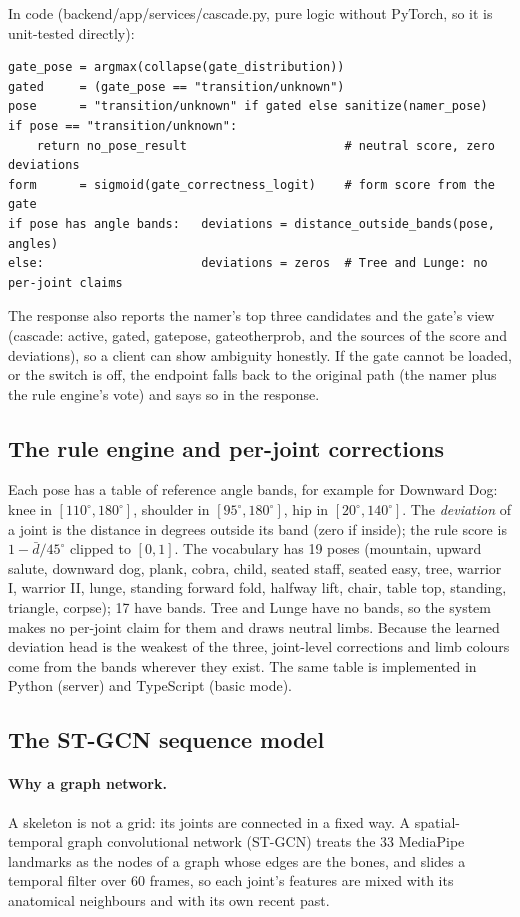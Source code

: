 \documentclass[11pt,a4paper]{article}
\newcommand{\ubrk}{\textunderscore\allowbreak}
\DeclareRobustCommand{\code}[1]{{\ttfamily\small\let\_\ubrk #1}}
\begin{document}
In code (\code{backend/app/services/cascade.py}, pure logic without PyTorch, so it is unit-tested directly):
\begin{lstlisting}
gate_pose = argmax(collapse(gate_distribution))
gated     = (gate_pose == "transition/unknown")
pose      = "transition/unknown" if gated else sanitize(namer_pose)
if pose == "transition/unknown":
    return no_pose_result                      # neutral score, zero deviations
form      = sigmoid(gate_correctness_logit)    # form score from the gate
if pose has angle bands:   deviations = distance_outside_bands(pose, angles)
else:                      deviations = zeros  # Tree and Lunge: no per-joint claims
\end{lstlisting}
The response also reports the namer's top three candidates and the gate's view (\code{cascade}: \code{active}, \code{gated}, \code{gate\_pose}, \code{gate\_other\_prob}, and the sources of the score and deviations), so a client can show ambiguity honestly. If the gate cannot be loaded, or the switch is off, the endpoint falls back to the original path (the namer plus the rule engine's vote) and says so in the response.

\subsection{The rule engine and per-joint corrections}
Each pose has a table of reference angle bands, for example for Downward Dog: knee in $[110^\circ,180^\circ]$, shoulder in $[95^\circ,180^\circ]$, hip in $[20^\circ,140^\circ]$. The \emph{deviation} of a joint is the distance in degrees outside its band (zero if inside); the rule score is $1-\bar d/45^\circ$ clipped to $[0,1]$. The vocabulary has 19 poses (mountain, upward salute, downward dog, plank, cobra, child, seated staff, seated easy, tree, warrior I, warrior II, lunge, standing forward fold, halfway lift, chair, table top, standing, triangle, corpse); 17 have bands. Tree and Lunge have no bands, so the system makes no per-joint claim for them and draws neutral limbs. Because the learned deviation head is the weakest of the three, joint-level corrections and limb colours come from the bands wherever they exist. The same table is implemented in Python (server) and TypeScript (basic mode).

\subsection{The ST-GCN sequence model}\label{sec:stgcn}
\paragraph{Why a graph network.} A skeleton is not a grid: its joints are connected in a fixed way. A spatial-temporal graph convolutional network (ST-GCN) treats the 33 MediaPipe landmarks as the nodes of a graph whose edges are the bones, and slides a temporal filter over 60 frames, so each joint's features are mixed with its anatomical neighbours and with its own recent past.
\end{document}

